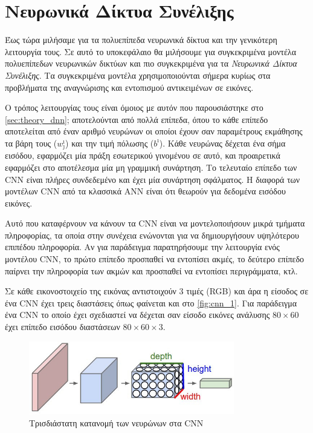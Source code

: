 \section{Νευρωνικά Δίκτυα Συνέλιξης}
\label{sec:theory_cnn}

Έως τώρα μιλήσαμε για τα πολυεπίπεδα νευρωνικά δίκτυα και την γενικότερη
λειτουργία τους. Σε αυτό το υποκεφάλαιο θα μιλήσουμε για συγκεκριμένα μοντέλα
πολυεπίπεδων νευρωνικών δικτύων και πιο συγκεκριμένα για τα
\emph{Νευρωνικά Δίκτυα Συνέλιξης}. Τα συγκεκριμένα μοντέλα χρησιμοποιούνται
σήμερα κυρίως στα προβλήματα της αναγνώρισης και εντοπισμού αντικειμένων
σε εικόνες.

Ο τρόπος λειτουργίας τους είναι όμοιος με αυτόν που παρουσιάστηκε στο %
\autoref{sec:theory_dnn}; αποτελούνται από πολλά επίπεδα, όπου το κάθε επίπεδο αποτελείται
από έναν αριθμό νευρώνων οι οποίοι έχουν σαν παραμέτρους εκμάθησης τα βάρη τους ($w_{\jmath}^{\imath}$)
και την τιμή πόλωσης ($b^{\imath}$).
Κάθε νευρώνας δέχεται ένα σήμα εισόδου, εφαρμόζει μία πράξη εσωτερικού γινομένου σε αυτό,
και προαιρετικά εφαρμόζει στο αποτέλεσμα μία μη γραμμική συνάρτηση.
Το τελευταίο επίπεδο των CNN είναι πλήρες συνδεδεμένο και έχει μία
συνάρτηση σφάλματος.
Η διαφορά των μοντέλων CNN από τα κλασσικά ANN είναι ότι θεωρούν για δεδομένα εισόδου
εικόνες.

Αυτό που καταφέρνουν να κάνουν τα CNN είναι να μοντελοποιήσουν μικρά
τμήματα πληροφορίας, τα οποία στην συνέχεια ενώνονται για να δημιουργήσουν
υψηλότερου επιπέδου πληροφορία. Αν για παράδειγμα παρατηρήσουμε την λειτουργία
ενός μοντέλου CNN, το πρώτο επίπεδο προσπαθεί να εντοπίσει ακμές, το δεύτερο
επίπεδο παίρνει την πληροφορία των ακμών και προσπαθεί να εντοπίσει περιγράμματα,
κτλ.

Σε κάθε εικονοστοιχείο της εικόνας αντιστοιχούν 3 τιμές (RGB) και άρα η είσοδος σε ένα
CNN έχει τρεις διαστάσεις όπως φαίνεται και στο \autoref{fig:cnn_1}.
Για παράδειγμα ένα CNN το οποίο έχει σχεδιαστεί να δέχεται σαν είσοδο εικόνες ανάλυσης $80\times60$
έχει επίπεδο εισόδου διαστάσεων $80\times60\times3$.

\begin{figure}[!ht]
  \centering
  \includegraphics[width=0.8\textwidth]{./images/chapter3/cnn.jpg}
  \caption[Τρισδιάστατη κατανομή των νευρώνων στα CNN]{Τρισδιάστατη κατανομή των νευρώνων στα CNN}
  \label{fig:cnn_1}
\end{figure}

